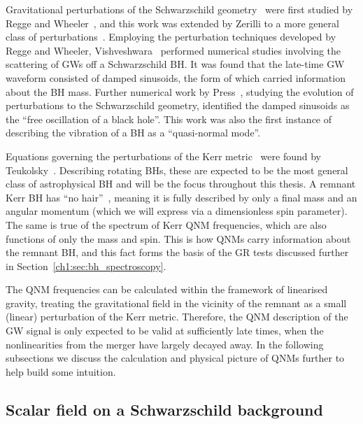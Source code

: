 Gravitational perturbations of the Schwarzschild geometry~\cite{Schwarzschild:1916uq} were first studied by Regge and Wheeler~\cite{Regge:1957td}, and this work was extended by Zerilli to a more general class of perturbations~\cite{Zerilli:1970se, Zerilli:1970wzz}.
Employing the perturbation techniques developed by Regge and Wheeler, Vishveshwara~\cite{Vishveshwara:1970zz} performed numerical studies involving the scattering of GWs off a Schwarzschild BH.
It was found that the late-time GW waveform consisted of damped sinusoids, the form of which carried information about the BH mass. 
Further numerical work by Press~\cite{Press:1971wr}, studying the evolution of perturbations to the Schwarzschild geometry, identified the damped sinusoids as the ``free oscillation of a black hole''.
This work was also the first instance of describing the vibration of a BH as a ``quasi-normal mode''.

Equations governing the perturbations of the Kerr metric~\cite{Kerr:1963ud} were found by Teukolsky~\cite{Teukolsky:1972my}. 
Describing rotating BHs, these are expected to be the most general class of astrophysical BH and will be the focus throughout this thesis. 
A remnant Kerr BH has ``no hair''~\cite{Carter:1971zc}, meaning it is fully described by only a final mass and an angular momentum (which we will express via a dimensionless spin parameter). 
The same is true of the spectrum of Kerr QNM frequencies, which are also functions of only the mass and spin. 
This is how QNMs carry information about the remnant BH, and this fact forms the basis of the GR tests discussed further in Section~\ref{ch1:sec:bh_spectroscopy}.

The QNM frequencies can be calculated within the framework of linearised gravity, treating the gravitational field in the vicinity of the remnant as a small (linear) perturbation of the Kerr metric.
Therefore, the QNM description of the GW signal is only expected to be valid at sufficiently late times, when the nonlinearities from the merger have largely decayed away. 
In the following subsections we discuss the calculation and physical picture of QNMs further to help build some intuition.


\subsection{Scalar field on a Schwarzschild background}
\label{ch1:sec:scalar}

